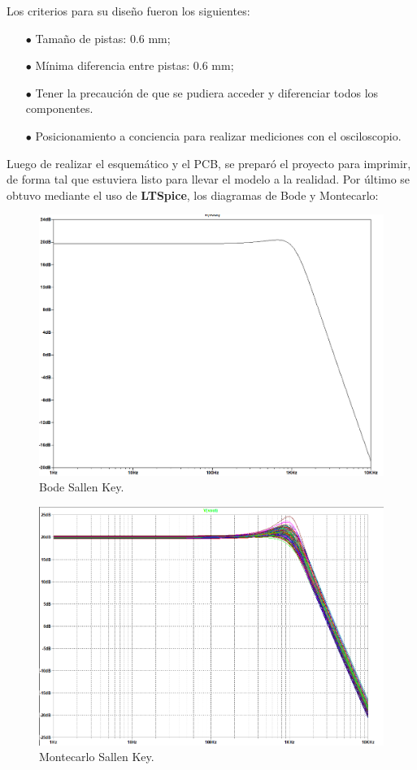 \documentclass[a4paper]{article}
\begin{document}
Los criterios para su diseño fueron los siguientes:
\begin{itemize}
\item[$\bullet$]Tamaño de pistas: 0.6 mm;
\item[$\bullet$]Mínima diferencia entre pistas: 0.6 mm;
\item[$\bullet$]Tener la precaución de que se pudiera acceder y diferenciar todos los componentes.
\item[$\bullet$]Posicionamiento a conciencia para realizar mediciones con el osciloscopio.
\end{itemize} 

Luego de realizar el esquemático y el PCB, se preparó el proyecto para imprimir, de forma tal que estuviera listo para llevar el modelo a la realidad.
Por último se obtuvo mediante el uso de \textbf{LTSpice}, los diagramas de Bode y Montecarlo:

\begin{figure}[H]
	\centering
	\includegraphics[width=\textwidth]{Altium-BODE}
	\caption{Bode Sallen Key.}
	\label{fig:BodeAltium}
\end{figure}

\begin{figure}[H]
	\centering
	\includegraphics[width=\textwidth]{Altium-MC}
	\caption{Montecarlo Sallen Key.}
	\label{fig:MCAltium}
\end{figure}
\end{document}
